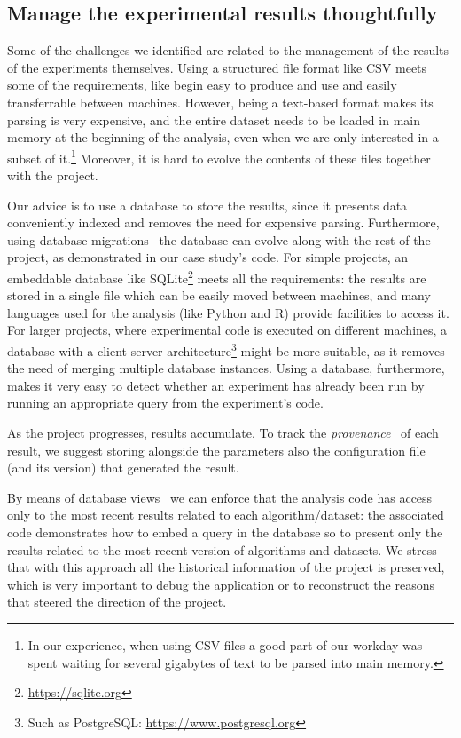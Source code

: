 \documentclass{llncs}
\begin{document}
\subsection{Manage the experimental results thoughtfully}

Some of the challenges we identified are related to the management of the results
of the experiments themselves.
Using a structured file format like CSV meets some of the requirements, like begin
easy to produce and use and easily transferrable between machines.
However, being a text-based format makes its parsing is very expensive, and
the entire dataset needs to be loaded in main memory at the beginning
of the analysis, even when we are only interested in a subset of it.\footnote{
  In our experience, when using CSV files a good part of our workday was spent 
  waiting for several gigabytes of text to be parsed into main memory.
}
Moreover, it is hard to evolve the contents of these files together with 
the project.

Our advice is to use a database to store the results, since it presents data 
conveniently indexed and removes the need for expensive parsing. Furthermore,
using database migrations~\cite{citation-needed} the database can evolve along with
the rest of the project, as demonstrated in our case study's code.
For simple projects, an embeddable database like SQLite\footnote{\url{https://sqlite.org}}
meets all the requirements: the results are stored in a single file which can be easily moved
between machines, and many languages used for the analysis (like Python and R) provide
facilities to access it.
For larger projects, where experimental code is executed on different machines, a database with
a client-server architecture\footnote{Such as PostgreSQL: \url{https://www.postgresql.org}} 
might be more suitable, as it removes the need of 
merging multiple database instances.
Using a database, furthermore, makes it very easy to detect whether 
an experiment has already been run by running an appropriate query from the experiment's code.

As the project progresses, results accumulate. To track the
\emph{provenance}~\cite{BunemanKW01} of each result, we suggest storing alongside
the parameters also the configuration file (and its version) that generated the result.

By means of database views~\cite{citation-needed} we can enforce that the analysis code
has access only to the most recent results related to each algorithm/dataset: the associated code
demonstrates how to embed a query in the database so to present only the results related to 
the most recent version of algorithms and datasets.
We stress that with this approach all the historical information of the project is preserved,
which is very important to debug the application or to reconstruct the reasons that
steered the direction of the project.
\end{document}

